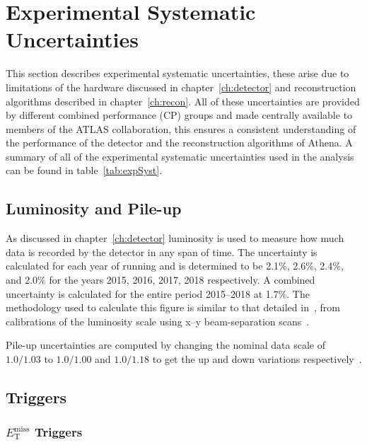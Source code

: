 \section{Experimental Systematic Uncertainties}
\label{sec:experimental-systs}

This section describes experimental systematic uncertainties, these arise due to
limitations of the hardware discussed in chapter~\ref{ch:detector} and
reconstruction algorithms described in chapter~\ref{ch:recon}. All of these
uncertainties are provided by different combined performance (CP) groups and
made centrally available to members of the ATLAS collaboration, this ensures a
consistent understanding of the performance of the detector and the
reconstruction algorithms of Athena. A summary of all of the experimental
systematic uncertainties used in the analysis can be found in
table~\ref{tab:expSyst}.


\subsection{Luminosity and Pile-up}
\label{sec:lumisys}

As discussed in chapter~\ref{ch:detector} luminosity is used to measure how much
data is recorded by the detector in any span of time. The uncertainty is
calculated for each year of running and is determined to be  2.1\%, 2.6\%,
2.4\%, and 2.0\% for the years 2015, 2016, 2017, 2018 respectively. A combined
uncertainty is calculated for the entire period 2015--2018 at 1.7\%. The
methodology used to calculate this figure is similar to that detailed
in~\cite{lumiDetermine}, from calibrations of the luminosity scale using x--y
beam-separation scans~\cite{lumiTwiki}.

Pile-up uncertainties are computed by changing the nominal data scale of
$1.0/1.03$ to $1.0/1.00$ and $1.0/1.18$ to get the up and down variations
respectively~\cite{puTWiki}.

\subsection{Triggers}
\label{sec:trigsys}

\subsubsection{\texorpdfstring{$E_{\mathrm{T}}^{\text{miss}}$}{MET} Triggers}

